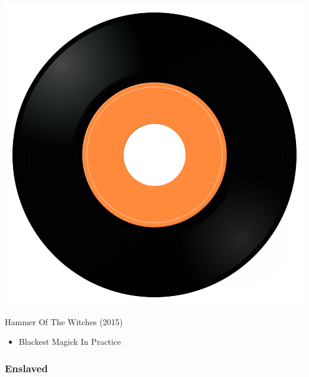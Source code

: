 \begin{minipage}[t]{0.25\textwidth}\vspace{0pt}
\captionsetup{type=figure}
\includegraphics[width=\textwidth]{Images/cover.png}
\caption*{Hammer Of The Witches (2015)}
\end{minipage}
\begin{minipage}[t]{0.25\textwidth}\vspace{0pt}
\begin{itemize}[nosep,leftmargin=1em,labelwidth=*,align=left]
	\setlength{\itemsep}{0pt}
	\item Blackest Magick In Practice
\end{itemize}
\end{minipage}

\subsubsection{Enslaved}

